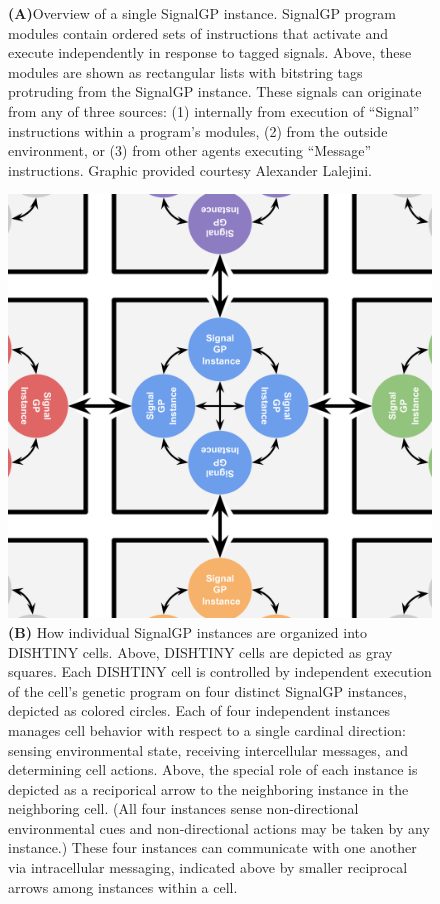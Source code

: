 \begin{figure}
\begin{center}
\begin{minipage}{0.49\textwidth}
\textbf{(A)}Overview of a single SignalGP instance.
SignalGP program modules contain ordered sets of instructions that activate and execute independently in response to tagged signals.
Above, these modules are shown as rectangular lists with bitstring tags protruding from the SignalGP instance.
These signals can originate from any of three sources:
  (1) internally from execution of ``Signal'' instructions within a program's modules,
  (2) from the outside environment, or
  (3) from other agents executing ``Message'' instructions.
Graphic provided courtesy Alexander Lalejini.
\end{minipage}
\begin{minipage}{0.49\textwidth}
  \includegraphics[width=\linewidth]{img/dishtinygp-cartoon}
  \textbf{(B)}
  How individual SignalGP instances are organized into DISHTINY cells.
  Above, DISHTINY cells are depicted as gray squares.
  Each DISHTINY cell is controlled by independent execution of the cell's genetic program on four distinct SignalGP instances, depicted as colored circles.
  Each of four independent instances manages cell behavior with respect to a single cardinal direction: sensing environmental state, receiving intercellular messages, and determining cell actions.
  Above, the special role of each instance is depicted as a reciporical arrow to the neighboring instance in the neighboring cell.
  (All four instances sense non-directional environmental cues and non-directional actions may be taken by any instance.)
  These four instances can communicate with one another via intracellular messaging, indicated above by smaller reciprocal arrows among instances within a cell.
\end{minipage}


\end{center}
\end{figure}
